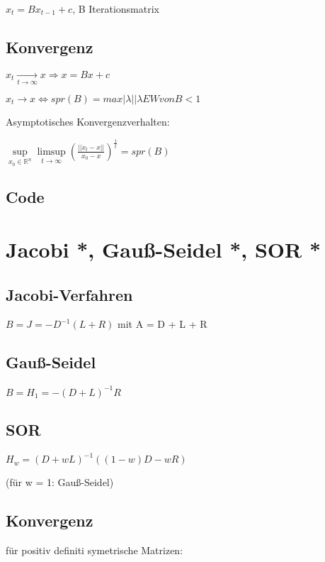 \documentclass[12pt,a4paper]{article} %
\begin{document}
	$x_t = Bx_{t - 1} + c$, B Iterationsmatrix
	
	\subsection{Konvergenz}
	
	$x_t \xrightarrow[t \rightarrow \infty]{} x \Rightarrow x = Bx + c$
	
	$x_t \rightarrow x \Leftrightarrow spr(B) = max{|\lambda| | \lambda EW von B} < 1$
	
	Asymptotisches Konvergenzverhalten:
	
	$\sup\limits_{x_0 \in \mathbb{R}^n} \limsup\limits_{t \rightarrow \infty}(\frac{||x_t - x||}{x_0 - x})^{\frac{1}{t}} = spr(B)$
	
	\subsection{Code}
	
	\newpage
	
	\section{Jacobi *, Gauß-Seidel *, SOR *}
	
	\subsection{Jacobi-Verfahren}
	
	$B = J = -D^{-1}(L + R)$ mit A = D + L + R
	
	\subsection{Gauß-Seidel}
	
	$B = H_1 = -(D + L)^{-1}R$
	
	\subsection{SOR}
	
	$H_w = (D + wL)^{-1}((1 - w)D - wR)$
	
	(für w = 1: Gauß-Seidel)
	
	\subsection{Konvergenz}
	
	für positiv definiti symetrische Matrizen:
	
\end{document}
